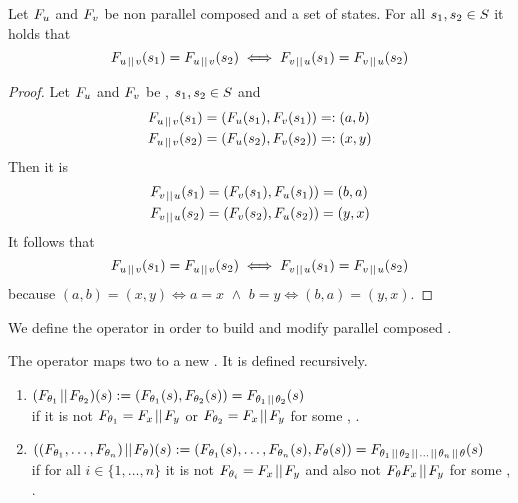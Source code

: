 \documentclass[preview]{standalone}
\begin{document}
\begin{proposition}
	Let $\grpfct[u]$ and $\grpfct[v]$ be non parallel composed \grpfctsN and \states a set of states. For all $\state_1, \state_2 \in \states$ it holds that
	\[
	\grpfct[u \pll v](\state_1) = \grpfct[u \pll v](\state_2) \iff \grpfct[v \pll u](\state_1) = \grpfct[v \pll u](\state_2)
	\]
\end{proposition}

\begin{proof}
	Let $\grpfct[u]$ and $\grpfct[v]$ be \grpfctsN, $\state_1, \state_2 \in \states$ and
	\begin{align*}
		\grpfct[u \pll v](\state_1) &= (\grpfct[u](\state_1), \grpfct[v](\state_1)) =: (a, b) \\
		\grpfct[u \pll v](\state_2) &= (\grpfct[u](\state_2), \grpfct[v](\state_2)) =: (x, y)			
	\end{align*}
	Then it is
	\begin{align*}
		\grpfct[v \pll u](\state_1) &= (\grpfct[v](\state_1), \grpfct[u](\state_1)) = (b, a) \\
		\grpfct[v \pll u](\state_2) &= (\grpfct[v](\state_2), \grpfct[u](\state_2)) = (y, x)
	\end{align*}
	It follows that
	\[
	\grpfct[u \pll v](\state_1) = \grpfct[u \pll v](\state_2) \iff \grpfct[v \pll u](\state_1) = \grpfct[v \pll u](\state_2)
	\]
	because $(a, b) = (x, y) \iff a = x \,\, \land \,\, b = y \iff (b, a) = (y, x)$.
\end{proof}

We define the operator \pll in order to build and modify parallel composed \viewsN. 

\begin{definition}
	The operator \pll maps two \grpfctsN to a new \grpfctN. It is defined recursively.
	\begin{enumerate}
		\item $(\grpfct[\viewppty_1] \pll \grpfct[\viewppty_2])(\state) := (\grpfct[\viewppty_1](\state),\grpfct[\viewppty_2](\state)) = \grpfct[\viewppty_1 \pll \viewppty_2](\state)$ \\
		if it is not $\grpfct[\viewppty_1] = \grpfct[x] \pll \grpfct[y]$ or $\grpfct[\viewppty_2] = \grpfct[x] \pll \grpfct[y]$ for some \grpfctsN \grpfct[x], \grpfct[y].
		\item $((\grpfct[\viewppty_1], \dots, \grpfct[\viewppty_n]) \pll \grpfct[\viewppty])(\state) := (\grpfct[\viewppty_1](\state), \dots, \grpfct[\viewppty_n](\state), \grpfct[\viewppty](\state)) = \grpfct[{\viewppty_1 \pll \viewppty_2 \pll \dots \pll \viewppty_n \pll \viewppty}](\state)$ 
		\\ if for all $i \in \{1, \dots, n\}$ it is not $\grpfct[\viewppty_i] = \grpfct[x] \pll \grpfct[y]$ and also not $\grpfct \grpfct[x] \pll \grpfct[y]$ for some \grpfctsN \grpfct[x], \grpfct[y].
	\end{enumerate}
	
\end{definition}
\end{document}
